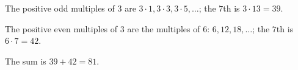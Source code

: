 The positive odd multiples of $3$ are $3\cdot1,3\cdot3,3\cdot5,\dots$; the $7$th is $3\cdot13=39$.

The positive even multiples of $3$ are the multiples of $6$: $6,12,18,\dots$; the $7$th is $6\cdot7=42$.

The sum is $39+42=\boxed{81}$.
